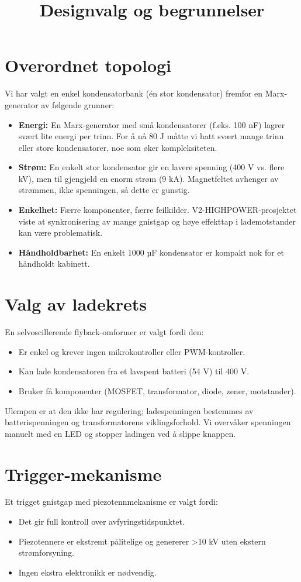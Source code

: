 \documentclass{article}
\title{Designvalg og begrunnelser}
\author{}
\date{}
\begin{document}
\maketitle

\section{Overordnet topologi}
Vi har valgt en enkel kondensatorbank (én stor kondensator) fremfor en Marx-generator av følgende grunner:
\begin{itemize}
\item \textbf{Energi:} En Marx-generator med små kondensatorer (f.eks. 100 nF) lagrer svært lite energi per trinn. For å nå 80 J måtte vi hatt svært mange trinn eller store kondensatorer, noe som øker kompleksiteten.
\item \textbf{Strøm:} En enkelt stor kondensator gir en lavere spenning (400 V vs. flere kV), men til gjengjeld en enorm strøm (9 kA). Magnetfeltet avhenger av strømmen, ikke spenningen, så dette er gunstig.
\item \textbf{Enkelhet:} Færre komponenter, færre feilkilder. V2-HIGHPOWER-prosjektet viste at synkronisering av mange gnistgap og høye effekttap i lademotstander kan være problematisk.
\item \textbf{Håndholdbarhet:} En enkelt 1000 µF kondensator er kompakt nok for et håndholdt kabinett.
\end{itemize}

\section{Valg av ladekrets}
En selvoscillerende flyback-omformer er valgt fordi den:
\begin{itemize}
\item Er enkel og krever ingen mikrokontroller eller PWM-kontroller.
\item Kan lade kondensatoren fra et lavspent batteri (54 V) til 400 V.
\item Bruker få komponenter (MOSFET, transformator, diode, zener, motstander).
\end{itemize}
Ulempen er at den ikke har regulering; ladespenningen bestemmes av batterispenningen og transformatorens viklingsforhold. Vi overvåker spenningen manuelt med en LED og stopper ladingen ved å slippe knappen.

\section{Trigger-mekanisme}
Et trigget gnistgap med piezotennmekanisme er valgt fordi:
\begin{itemize}
\item Det gir full kontroll over avfyringstidspunktet.
\item Piezotennere er ekstremt pålitelige og genererer >10 kV uten ekstern strømforsyning.
\item Ingen ekstra elektronikk er nødvendig.
\end{itemize}
\end{document}
